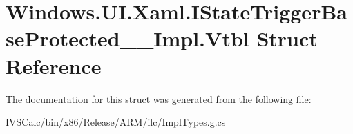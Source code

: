 \hypertarget{struct_windows_1_1_u_i_1_1_xaml_1_1_i_state_trigger_base_protected_____impl_1_1_vtbl}{}\section{Windows.\+U\+I.\+Xaml.\+I\+State\+Trigger\+Base\+Protected\+\_\+\+\_\+\+Impl.\+Vtbl Struct Reference}
\label{struct_windows_1_1_u_i_1_1_xaml_1_1_i_state_trigger_base_protected_____impl_1_1_vtbl}


The documentation for this struct was generated from the following file\+:\begin{DoxyCompactItemize}
\item 
I\+V\+S\+Calc/bin/x86/\+Release/\+A\+R\+M/ilc/Impl\+Types.\+g.\+cs\end{DoxyCompactItemize}
